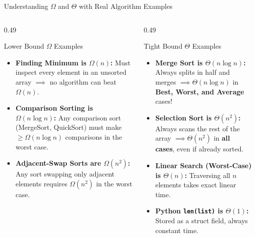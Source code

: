 \documentclass[aspectratio=169]{beamer}
\begin{document}
\begin{frame}{Understanding $\Omega$ and $\Theta$ with Real Algorithm Examples}
  \begin{columns}[T]
    \begin{column}{0.49\textwidth}
      \begin{block}{Lower Bound $\Omega$ Examples}
        \scriptsize
        \begin{itemize}\setlength{\itemsep}{0.25em}
          \item \textbf{Finding Minimum is $\Omega(n)$:}
            Must inspect every element in an unsorted array $\implies$ no algorithm can beat $\Omega(n)$.
          \item \textbf{Comparison Sorting is $\Omega(n\log n)$:}
            Any comparison sort (MergeSort, QuickSort) must make $\ge \Omega(n\log n)$ comparisons in the worst case.
          \item \textbf{Adjacent-Swap Sorts are $\Omega(n^2)$:}
            Any sort swapping only adjacent elements requires $\Omega(n^2)$ in the worst case.
        \end{itemize}
      \end{block}
    \end{column}
    \begin{column}{0.49\textwidth}
      \begin{exampleblock}{Tight Bound $\Theta$ Examples}
        \scriptsize
        \begin{itemize}\setlength{\itemsep}{0.25em}
          \item \textbf{Merge Sort is $\Theta(n\log n)$:}
            Always splits in half and merges $\implies \Theta(n\log n)$ in \textbf{Best, Worst, and Average} cases!
          \item \textbf{Selection Sort is $\Theta(n^2)$:}
            Always scans the rest of the array $\implies \Theta(n^2)$ in \textbf{all cases}, even if already sorted.
          \item \textbf{Linear Search (Worst-Case) is $\Theta(n)$:}
            Traversing all $n$ elements takes exact linear time.
          \item \textbf{Python \texttt{len(list)} is $\Theta(1)$:}
            Stored as a struct field, always constant time.
        \end{itemize}
      \end{exampleblock}
    \end{column}
  \end{columns}
\end{frame}
\end{document}
